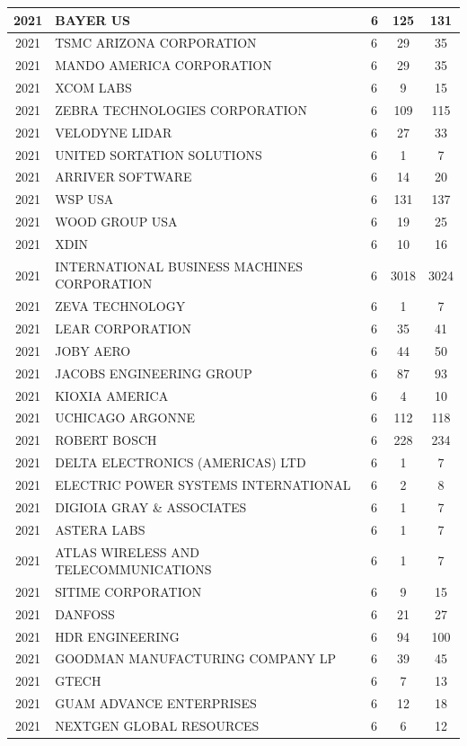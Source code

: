 \documentclass{article}%
\begin{document}
\begin{longtable}{c|p{20em}|p{5em}|c|c}
\hline%
2021&BAYER US&6&125&131\\%
\hline%
2021&TSMC ARIZONA CORPORATION&6&29&35\\%
\hline%
2021&MANDO AMERICA CORPORATION&6&29&35\\%
\hline%
2021&XCOM LABS&6&9&15\\%
\hline%
2021&ZEBRA TECHNOLOGIES CORPORATION&6&109&115\\%
\hline%
2021&VELODYNE LIDAR&6&27&33\\%
\hline%
2021&UNITED SORTATION SOLUTIONS&6&1&7\\%
\hline%
2021&ARRIVER SOFTWARE&6&14&20\\%
\hline%
2021&WSP USA&6&131&137\\%
\hline%
2021&WOOD GROUP USA&6&19&25\\%
\hline%
2021&XDIN&6&10&16\\%
\hline%
2021&INTERNATIONAL BUSINESS MACHINES CORPORATION&6&3018&3024\\%
\hline%
2021&ZEVA TECHNOLOGY&6&1&7\\%
\hline%
2021&LEAR CORPORATION&6&35&41\\%
\hline%
2021&JOBY AERO&6&44&50\\%
\hline%
2021&JACOBS ENGINEERING GROUP&6&87&93\\%
\hline%
2021&KIOXIA AMERICA&6&4&10\\%
\hline%
2021&UCHICAGO ARGONNE&6&112&118\\%
\hline%
2021&ROBERT BOSCH&6&228&234\\%
\hline%
2021&DELTA ELECTRONICS (AMERICAS) LTD&6&1&7\\%
\hline%
2021&ELECTRIC POWER SYSTEMS INTERNATIONAL&6&2&8\\%
\hline%
2021&DIGIOIA GRAY \& ASSOCIATES&6&1&7\\%
\hline%
2021&ASTERA LABS&6&1&7\\%
\hline%
2021&ATLAS WIRELESS AND TELECOMMUNICATIONS&6&1&7\\%
\hline%
2021&SITIME CORPORATION&6&9&15\\%
\hline%
2021&DANFOSS&6&21&27\\%
\hline%
2021&HDR ENGINEERING&6&94&100\\%
\hline%
2021&GOODMAN MANUFACTURING COMPANY LP&6&39&45\\%
\hline%
2021&GTECH&6&7&13\\%
\hline%
2021&GUAM ADVANCE ENTERPRISES&6&12&18\\%
\hline%
2021&NEXTGEN GLOBAL RESOURCES&6&6&12\\%

\end{longtable}
\end{document}
